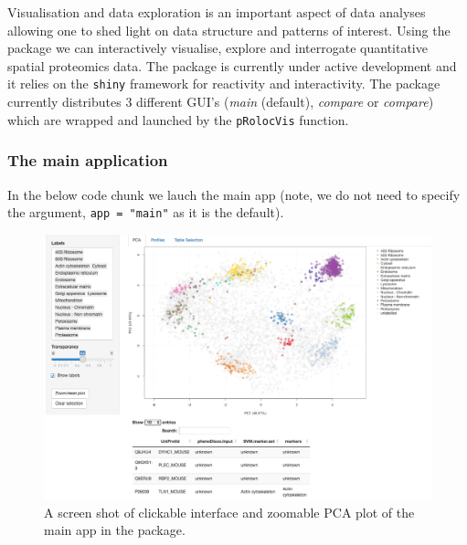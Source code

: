 Visualisation and data exploration is an important aspect of data
analyses allowing one to shed light on data structure and patterns of
interest. Using the  package we can interactively
visualise, explore and interrogate quantitative spatial proteomics
data. The  package is currently under active
development and it relies on the \texttt{shiny} framework for
reactivity and interactivity. The package currently distributes 3
different GUI's (\textit{main} (default), \textit{compare} or
\textit{compare}) which are wrapped and launched by the
\texttt{pRolocVis} function. 

\subsubsection*{The main application}
In the below code chunk we lauch the main
app (note, we do not need to specify the argument, \texttt{app =
  "main"} as it is the default).

\begin{knitrout}
\color{fgcolor}\begin{kframe}
\begin{alltt}
\hlstd{(}\hlstd{)}
\end{alltt}
\end{kframe}
\end{knitrout}

\begin{figure}[!ht]
  \centering
  \includegraphics[width=\textwidth]{./Figures/mainapp.png}
  \caption{A screen shot of clickable interface and zoomable PCA plot
    of the main app in the  package. }
  \label{fig:app}
\end{figure}

